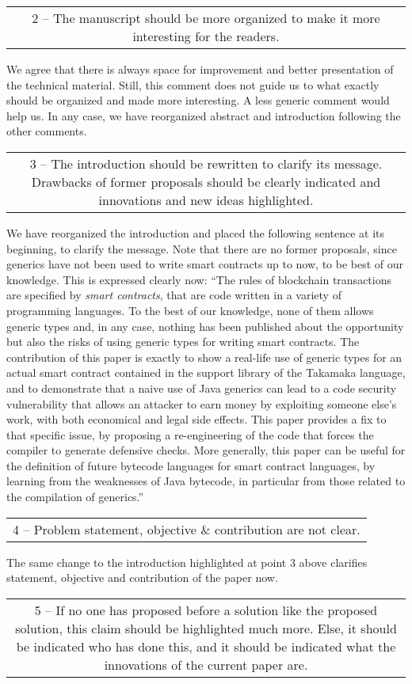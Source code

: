 \documentclass[journal,onecolumn, 11pt]{IEEEtran}
\newcommand{\BOX}[1]
{
  {\it
    \begin{center}
      \begin{tabular}{|c|}
        \hline
        \parbox{0.97\columnwidth}{
          \medskip
          #1
          \medskip} \\
        \hline
      \end{tabular}
    \end{center}
  }
}
\begin{document}
\BOX{
2 -- The manuscript should be more organized to make it more interesting for the readers.
}

We agree that there is always space for improvement and better presentation of the technical material. Still, this comment does not guide us to what exactly should be organized and made more interesting. A less generic comment would help us. In any case, we have reorganized abstract and introduction following the other comments.


\BOX{
3 -- The introduction should be rewritten to clarify its message. Drawbacks of former proposals should be clearly indicated and innovations and new ideas highlighted.
}

We have reorganized the introduction and placed the following sentence at its beginning, to clarify the message. Note that there are no former proposals, since generics have not been used to write smart contracts up to now, to be best of our knowledge. This is expressed clearly now:
``The rules of blockchain transactions are specified by \emph{smart contracts},
that are code written in a variety of programming languages. To the best of our knowledge, none of them allows generic types and, in any case,
nothing has been published about the opportunity but also the risks of using generic types for writing smart contracts.
The contribution of this paper is exactly to show a real-life
use of generic types for an actual smart contract contained in the support
library of the Takamaka language,
and to demonstrate that a naive use
of Java generics can lead to a code security vulnerability that
allows an attacker to earn money by exploiting someone else's work, with both economical and legal side effects.
This paper provides a fix to that specific issue,
by proposing a re-engineering of the code that forces the compiler to generate defensive checks.
More generally, this paper can be useful for the definition of
future bytecode languages for smart contract languages, by
learning from the weaknesses of Java bytecode, in particular from those related to the
compilation of generics.''


\BOX{
4 -- Problem statement, objective \& contribution are not clear.
}

The same change to the introduction highlighted at point 3 above clarifies statement, objective and contribution of the paper now.

\BOX{
5 -- If no one has proposed before a solution like the proposed solution, this claim should be highlighted much more. Else, it should be indicated who has done this, and it should be indicated what the innovations of the current paper are.
}
\end{document}

